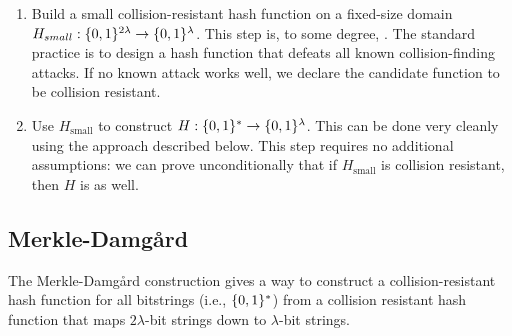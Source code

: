 
\begin{enumerate}
  \item Build a small collision-resistant hash
    function on a fixed-size domain $H_{small}: \{0,1\}^{2\lambda} \rightarrow \{0,1\}^\lambda$.
    This step is, to some degree, .
    The standard practice is to design a hash function that
    defeats all known collision-finding attacks.
    If no known attack works well, we declare the
    candidate function to be collision resistant.

	\item Use $H_{\text{small}}$ to construct $H: \{0,1\}^* \rightarrow \{0,1\}^\lambda$.
    This can be done very cleanly using the  approach described
    below.
    This step requires no additional assumptions:
    we can prove unconditionally that if $H_{\text{small}}$ is
    collision resistant, then $H$ is as well.
\end{enumerate}


\subsection{Merkle-Damg\aa{}rd}
The Merkle-Damg\aa{}rd construction gives a way to construct
a collision-resistant hash function for all bitstrings (i.e., $\{0,1\}^*$)
from a collision resistant hash function that maps $2\lambda$-bit strings
down to $\lambda$-bit strings.

